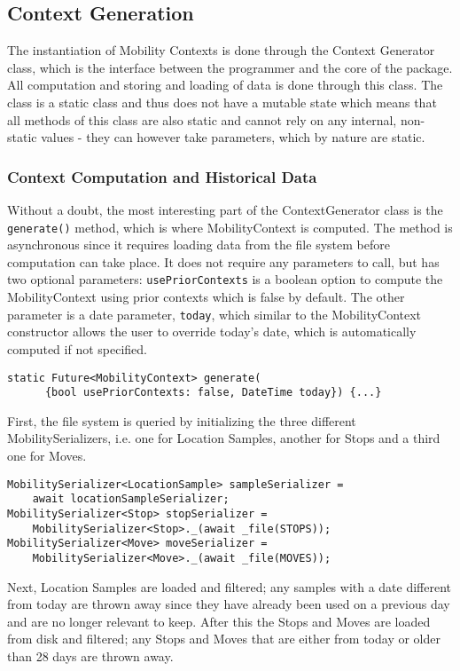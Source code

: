 \subsection{Context Generation}
The instantiation of Mobility Contexts is done through the Context Generator class, which is the interface between the programmer and the core of the package. All computation and storing and loading of data is done through this class. The class is a static class and thus does not have a mutable state which means that all methods of this class are also static and cannot rely on any internal, non-static values - they can however take parameters, which by nature are static. 



\subsubsection{Context Computation and Historical Data}
Without a doubt, the most interesting part of the ContextGenerator class is the \verb|generate()| method, which is where MobilityContext is computed. The method is asynchronous since it requires loading data from the file system before computation can take place. It does not require any parameters to call, but has two optional parameters: \verb|usePriorContexts| is a boolean option to compute the MobilityContext using prior contexts which is false by default. The other parameter is a date parameter, \verb|today|, which similar to the MobilityContext constructor allows the user to override today's date, which is automatically computed if not specified.

\begin{verbatim}
static Future<MobilityContext> generate(
      {bool usePriorContexts: false, DateTime today}) {...}
\end{verbatim}

First, the file system is queried by initializing the three different MobilitySerializers, i.e. one for Location Samples, another for Stops and a third one for Moves. 
\begin{verbatim}
MobilitySerializer<LocationSample> sampleSerializer =
    await locationSampleSerializer;
MobilitySerializer<Stop> stopSerializer =
    MobilitySerializer<Stop>._(await _file(STOPS));
MobilitySerializer<Move> moveSerializer =
    MobilitySerializer<Move>._(await _file(MOVES));
\end{verbatim}

Next, Location Samples are loaded and filtered; any samples with a date different from today are thrown away since they have already been used on a previous day and are no longer relevant to keep. After this the Stops and Moves are loaded from disk and filtered; any Stops and Moves that are either from today or older than 28 days are thrown away.

